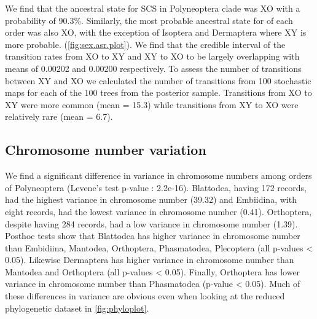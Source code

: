 We find that the ancestral state for SCS in Polyneoptera clade was XO with a probability of 90.3\%.
Similarly, the most probable ancestral state for of each order was also XO, with the exception of Isoptera and Dermaptera where XY is more probable.
(\cref{fig:sex.asr.plot}).
We find that the credible interval of the transition rates from XO to XY and XY to XO to be largely overlapping with means of 0.00202 and 0.00200 respectively. 
To assess the number of transitions between XY and XO we calculated the number of transitions from 100 stochastic maps for each of the 100 trees from the posterior sample.
Transitions from XO to XY were more common (mean = 15.3) while transitions from XY to XO were relatively rare (mean = 6.7).

\subsection{Chromosome number variation}
We find a significant difference in variance in chromosome numbers among orders of Polyneoptera (Levene's test p-value : 2.2e-16). 
Blattodea, having 172 records, had the highest variance in chromosome number (39.32) and  Embiidina, with eight records, had the lowest variance in chromosome number (0.41).
Orthoptera, despite having 284 records, had a low variance in chromosome number (1.39). 
Posthoc tests show that Blattodea has higher variance in chromosome number than Embidiina, Mantodea, Orthoptera, Phasmatodea, Plecoptera (all p-values < 0.05). 
Likewise Dermaptera has higher variance in chromosome number than Mantodea and Orthoptera (all p-values < 0.05). 
Finally, Orthoptera has lower variance in chromosome number than Phasmatodea (p-value < 0.05).
Much of these differences in variance are obvious even when looking at the reduced phylogenetic dataset in \cref{fig:phyloplot}.

